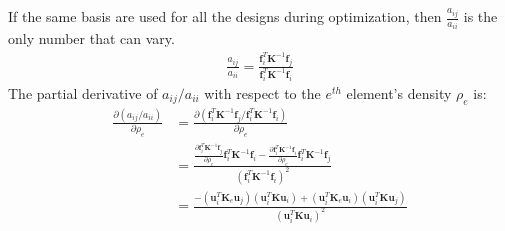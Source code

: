 If the same basis are used for all the designs during optimization, then $\frac{a_{ij}}{a_{ii}}$ is the only number that can vary.
\begin{align}
  \frac{a_{ij}}{a_{ii}} = \frac{\bm{f}_i^T \bm{K}^{-1} \bm{f}_j}{\bm{f}_i^T \bm{K}^{-1} \bm{f}_i}
\end{align}
The partial derivative of $a_{ij} / a_{ii}$ with respect to the $e^{th}$ element's density $\rho_e$ is:
\begin{align}
  \frac{\partial (a_{ij} / a_{ii})}{\partial \rho_e} & = \frac{\partial (\bm{f}_i^T \bm{K}^{-1} \bm{f}_j / \bm{f}_i^T \bm{K}^{-1} \bm{f}_i)}{\partial \rho_e} \\
  & = \frac{\frac{\partial \bm{f}_i^T \bm{K}^{-1} \bm{f}_j}{\partial \rho_e} \bm{f}_i^T \bm{K}^{-1} \bm{f}_i - \frac{\partial \bm{f}_i^T \bm{K}^{-1} \bm{f}_i}{\partial \rho_e} \bm{f}_i^T \bm{K}^{-1} \bm{f}_j}{(\bm{f}_i^T \bm{K}^{-1} \bm{f}_i)^2} \\
  & = \frac{-(\bm{u}_i^T \bm{K}_e \bm{u}_j) (\bm{u}_i^T \bm{K} \bm{u}_i) + (\bm{u}_i^T \bm{K}_e \bm{u}_i) (\bm{u}_i^T \bm{K} \bm{u}_j)}{(\bm{u}_i^T \bm{K} \bm{u}_i)^2} \\
\end{align}

